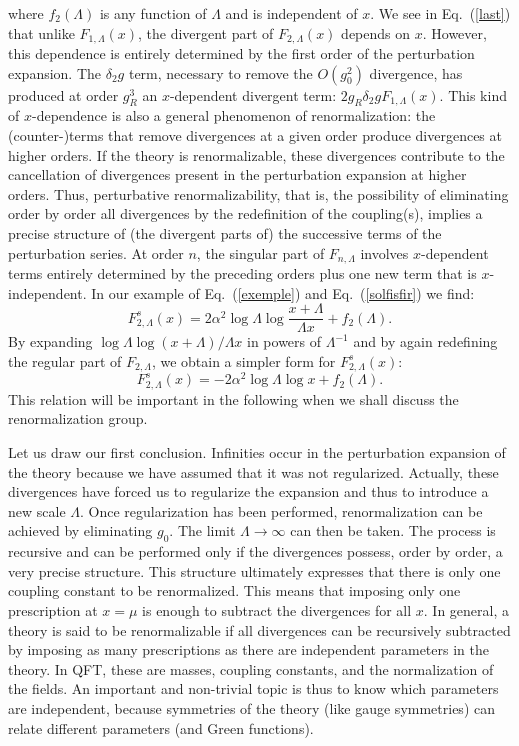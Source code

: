 \documentclass[floatfix,twocolumn,preprintnumbers,amsmath,amssymb,prb]{revtex4}
\begin{document}
where $f_2(\Lambda)$ is any function of $\Lambda$ and is
independent of $x$. We see in Eq.~(\ref{last}) that unlike
$F_{1,\Lambda}(x)$, the divergent part of $F_{2,\Lambda}(x)$
depends on $x$. However, this dependence is entirely determined by
the first order of the perturbation expansion. The 
$\delta_2g$ term, necessary to remove the $O(g_0^2)$ divergence, has 
produced at order $g_R^3$ an $x$-dependent divergent term: $2
g_R \delta_2 g F_{1,\Lambda}(x)$.
This kind of $x$-dependence is also a general phenomenon of
renormalization: the (counter-)terms that remove divergences at a
given order produce divergences at higher orders. If the theory is
renormalizable, these divergences contribute to the cancellation
of divergences present in the perturbation expansion at higher
orders. Thus, perturbative renormalizability, that is, the
possibility of eliminating order by order all divergences by the redefinition
of the coupling(s),
implies a precise structure of (the divergent parts of) the
successive terms of the perturbation series. At order $n$, the
singular part of
$F_{n,\Lambda}$ involves $x$-dependent terms entirely determined
by the preceding orders plus one new term that is
$x$-independent. In our example of Eq.~(\ref{exemple}) and
Eq.~(\ref{solfisfir}) we find:
\begin{equation}
F_{2,\Lambda}^s(x) = 2 \alpha^2 \log\Lambda
\log\frac{x+\Lambda}{\Lambda x}+ f_2(\Lambda).
\end{equation}
By expanding $\log\Lambda \log(x+\Lambda)/{\Lambda x}$ in powers
of $\Lambda^{-1}$ and by again redefining the regular part of
$F_{2,\Lambda}$, we obtain a simpler form for $F_{2,\Lambda}^s(x)$:
\begin{equation}
F_{2,\Lambda}^s(x) = -2 \alpha^2 \log\Lambda \log x+
f_2(\Lambda).
\label{solution2exemple}
\end{equation}
This relation will be important in the following when we shall
discuss the renormalization group. 

Let us draw our first conclusion. Infinities occur in the
perturbation expansion of the theory because we have assumed that
it was not regularized. Actually, these divergences have forced us
to regularize the expansion and thus to introduce a new scale
$\Lambda$. Once regularization has been performed, renormalization
can be achieved by eliminating $g_0$.
The limit $\Lambda\to\infty$ can then be taken. The process is
recursive and can be performed only if the divergences possess,
order by order, a very precise structure. This structure
ultimately expresses that there is only one coupling constant to
be renormalized. This means that imposing only one prescription at 
$x=\mu$ is enough to subtract the divergences for all $x$. In general, a
theory is said to be renormalizable if all divergences can be
recursively subtracted by imposing as many prescriptions as there
are independent parameters in the theory. In QFT, these are 
masses, coupling constants, and the normalization of the fields. An
important and non-trivial topic is thus to know which parameters
are independent, because symmetries of the theory (like gauge
symmetries) can relate different parameters (and Green functions). 
\end{document}
